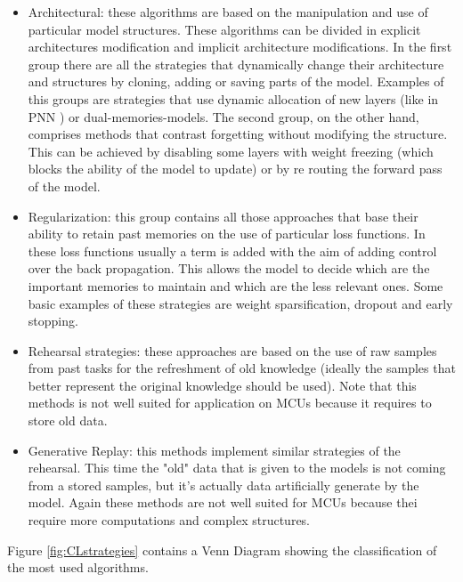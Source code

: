 \documentclass[12pt]{report}
\begin{document}
\begin{itemize}
\item Architectural: these algorithms are based on the manipulation and use of particular model structures. These algorithms can be divided in explicit architectures modification and implicit architecture modifications. In the first group there are all the strategies that dynamically change their architecture and structures by cloning, adding or saving parts of the model. Examples of this groups are strategies that use dynamic allocation of new layers (like in PNN \cite{rusu2016progressive}) or dual-memories-models. The second group, on the other hand, comprises methods that contrast forgetting without modifying the structure. This can be achieved by disabling some layers with weight freezing (which blocks the ability of the model to update) or by re routing the forward pass of the model.
\item Regularization: this group contains all those approaches that base their ability to retain past memories on the use of particular loss functions. In these loss functions usually a term is added with the aim of adding control over the back propagation. This allows the model to decide which are the important memories to maintain and which are the less relevant ones. Some basic examples of these strategies are weight sparsification, dropout and early stopping.
\item Rehearsal strategies: these approaches are based on the use of raw samples from past tasks for the refreshment of old knowledge (ideally the samples that better represent the original knowledge should be used).  Note that this methods is not well suited for application on MCUs because it requires to store old data. 
\item Generative Replay: this methods implement similar strategies of the rehearsal. This time the "old" data that is given to the models is not coming from a stored samples, but it's actually data artificially generate by the model. Again these methods are not well suited for MCUs because thei require more computations and complex structures. 
\end{itemize} 

Figure \ref{fig:CLstrategies} contains a Venn Diagram showing the classification of the most used algorithms.
\end{document}
